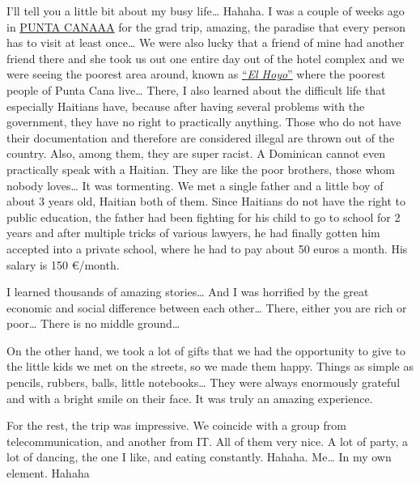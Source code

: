 \documentclass[]{book}
\begin{document}
I'll tell you a little bit about my busy life\ldots{} Hahaha. I was a couple of weeks ago in \href{https://en.wikipedia.org/wiki/Punta_Cana}{PUNTA CANAAA} for the grad trip, amazing, the paradise that every person has to visit at least once\ldots{} We were also lucky that a friend of mine had another friend there and she took us out one entire day out of the hotel complex and we were seeing the poorest area around, known as \href{https://www.youtube.com/watch?v=cvfWWfLgpgw}{``\emph{El Hoyo}''} where the poorest people of Punta Cana live\ldots{} There, I also learned about the difficult life that especially Haitians have, because after having several problems with the government, they have no right to practically anything. Those who do not have their documentation and therefore are considered illegal are thrown out of the country. Also, among them, they are super racist. A Dominican cannot even practically speak with a Haitian. They are like the poor brothers, those whom nobody loves\ldots{} It was tormenting. We met a single father and a little boy of about 3 years old, Haitian both of them. Since Haitians do not have the right to public education, the father had been fighting for his child to go to school for 2 years and after multiple tricks of various lawyers, he had finally gotten him accepted into a private school, where he had to pay about 50 euros a month. His salary is 150 €/month.

I learned thousands of amazing stories\ldots{} And I was horrified by the great economic and social difference between each other\ldots{} There, either you are rich or poor\ldots{} There is no middle ground\ldots{}

On the other hand, we took a lot of gifts that we had the opportunity to give to the little kids we met on the streets, so we made them happy. Things as simple as pencils, rubbers, balls, little notebooks\ldots{} They were always enormously grateful and with a bright smile on their face. It was truly an amazing experience.

For the rest, the trip was impressive. We coincide with a group from telecommunication, and another from IT. All of them very nice. A lot of party, a lot of dancing, the one I like, and eating constantly. Hahaha. Me\ldots{} In my own element. Hahaha
\end{document}

